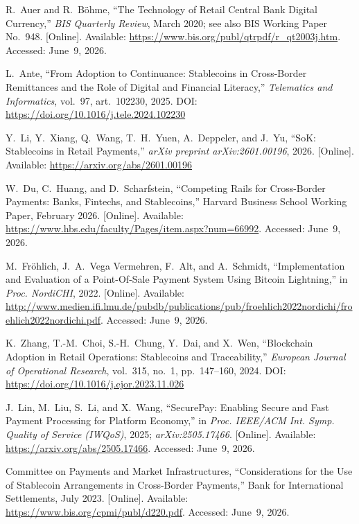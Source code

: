 \documentclass[12pt,a4paper]{report}
\begin{document}
{\begin{enumerate}[label={[\arabic*]}]
\item R.~Auer and R.~B\"{o}hme, ``The Technology of Retail Central Bank Digital Currency,'' \textit{BIS Quarterly Review}, March 2020; see also BIS Working Paper No.~948. [Online]. Available: \url{https://www.bis.org/publ/qtrpdf/r_qt2003j.htm}. Accessed: June~9, 2026.

\item L.~Ante, ``From Adoption to Continuance: Stablecoins in Cross-Border Remittances and the Role of Digital and Financial Literacy,'' \textit{Telematics and Informatics}, vol.~97, art.~102230, 2025. DOI: \url{https://doi.org/10.1016/j.tele.2024.102230}

\item Y.~Li, Y.~Xiang, Q.~Wang, T.~H.~Yuen, A.~Deppeler, and J.~Yu, ``SoK: Stablecoins in Retail Payments,'' \textit{arXiv preprint arXiv:2601.00196}, 2026. [Online]. Available: \url{https://arxiv.org/abs/2601.00196}

\item W.~Du, C.~Huang, and D.~Scharfstein, ``Competing Rails for Cross-Border Payments: Banks, Fintechs, and Stablecoins,'' Harvard Business School Working Paper, February 2026. [Online]. Available: \url{https://www.hbs.edu/faculty/Pages/item.aspx?num=66992}. Accessed: June~9, 2026.

\item M.~Fr\"{o}hlich, J.~A.~Vega Vermehren, F.~Alt, and A.~Schmidt, ``Implementation and Evaluation of a Point-Of-Sale Payment System Using Bitcoin Lightning,'' in \textit{Proc. NordiCHI}, 2022. [Online]. Available: \url{http://www.medien.ifi.lmu.de/pubdb/publications/pub/froehlich2022nordichi/froehlich2022nordichi.pdf}. Accessed: June~9, 2026.

\item K.~Zhang, T.-M.~Choi, S.-H.~Chung, Y.~Dai, and X.~Wen, ``Blockchain Adoption in Retail Operations: Stablecoins and Traceability,'' \textit{European Journal of Operational Research}, vol.~315, no.~1, pp.~147--160, 2024. DOI: \url{https://doi.org/10.1016/j.ejor.2023.11.026}

\item J.~Lin, M.~Liu, S.~Li, and X.~Wang, ``SecurePay: Enabling Secure and Fast Payment Processing for Platform Economy,'' in \textit{Proc. IEEE/ACM Int. Symp. Quality of Service (IWQoS)}, 2025; \textit{arXiv:2505.17466}. [Online]. Available: \url{https://arxiv.org/abs/2505.17466}. Accessed: June~9, 2026.

\item Committee on Payments and Market Infrastructures, ``Considerations for the Use of Stablecoin Arrangements in Cross-Border Payments,'' Bank for International Settlements, July 2023. [Online]. Available: \url{https://www.bis.org/cpmi/publ/d220.pdf}. Accessed: June~9, 2026.


\end{enumerate}}
\end{document}
